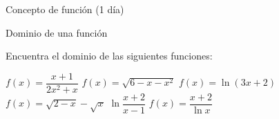 \begin{definicion}{Concepto de función (1 día)}
\end{definicion}    
\begin{definicion}{Dominio de una función}
\end{definicion}
\begin{ejercicios}
\ej Encuentra el dominio de las siguientes funciones:
\begin{apartadosc}
 \ap $f(x)=\dfrac{x+1}{2x^2+x}$
 \ap $f(x)=\sqrt{6-x-x^2}$
 \ap $f(x)=\ln{(3x+2)}$
 \ap $\displaystyle{f(x)=\sqrt{2-x}-\sqrt{x}}$
 \ap $\ln\dfrac{x+2}{x-1}$
 \ap $f(x)=\dfrac{x+2}{\ln{x}}$
\end{apartadosc}
\end{ejercicios}

